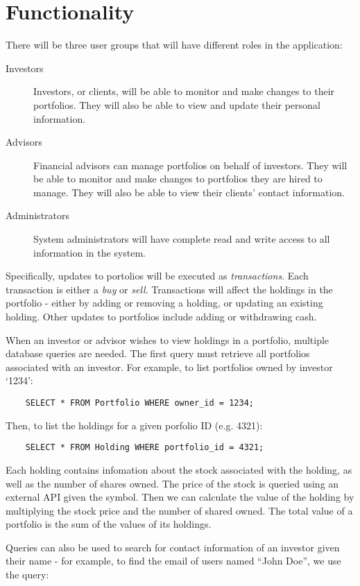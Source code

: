 \documentclass[letterpaper]{report}
\begin{document}
\section*{Functionality}
There will be three user groups that will have different roles in the application:
\begin{description}
	\item[Investors] Investors, or clients, will be able to monitor and make changes to their portfolios. They will also be able to view and update their personal information.
	\item[Advisors] Financial advisors can manage portfolios on behalf of investors. They will be able to monitor and make changes to portfolios they are hired to manage. They will also be able to view their clients' contact information.
	\item[Administrators] System administrators will have complete read and write access to all information in the system.
\end{description}

Specifically, updates to portolios will be executed as {\em transactions}. Each transaction is either a {\em buy} or {\em sell}. Transactions will affect the holdings in the portfolio - either by adding or removing a holding, or updating an existing holding. Other updates to portfolios include adding or withdrawing cash.

When an investor or advisor wishes to view holdings in a portfolio, multiple database queries are needed. The first query must retrieve all portfolios associated with an investor. For example, to list portfolios owned by investor `1234':

\verb|    SELECT * FROM Portfolio WHERE owner_id = 1234;|

Then, to list the holdings for a given porfolio ID (e.g. 4321):

\verb|    SELECT * FROM Holding WHERE portfolio_id = 4321;|

Each holding contains infomation about the stock associated with the holding, as well as the number of shares owned. The price of the stock is queried using an external API given the symbol. Then we can calculate the value of the holding by multiplying the stock price and the number of shared owned. The total value of a portfolio is the sum of the values of its holdings.

Queries can also be used to search for contact information of an investor given their name - for example, to find the email of users named ``John Doe'', we use the query:
\end{document}
